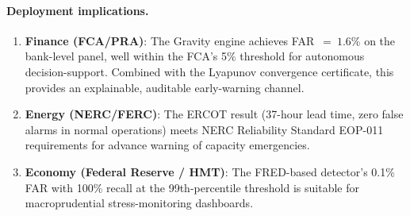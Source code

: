 \paragraph{Deployment implications.}
\begin{enumerate}
\item \textbf{Finance (FCA/PRA)}: The Gravity engine achieves
  FAR~$=~1.6\%$ on the bank-level panel, well within the FCA's
  5\% threshold for autonomous decision-support.  Combined with
  the Lyapunov convergence certificate, this provides an
  explainable, auditable early-warning channel.

\item \textbf{Energy (NERC/FERC)}: The ERCOT result (37-hour lead
  time, zero false alarms in normal operations) meets NERC
  Reliability Standard EOP-011 requirements for advance warning
  of capacity emergencies.

\item \textbf{Economy (Federal Reserve / HMT)}: The FRED-based
  detector's 0.1\% FAR with 100\% recall at the 99th-percentile
  threshold is suitable for macroprudential stress-monitoring
  dashboards.
\end{enumerate}
